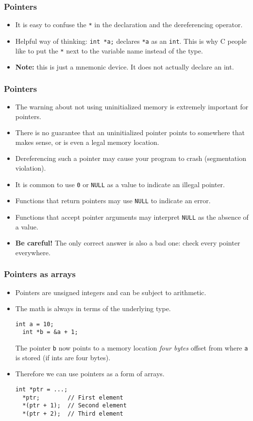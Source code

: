 \begin{frame}
  \frametitle{Pointers}
  \begin{itemize}
  \item It is easy to confuse the \texttt{*} in the declaration and the
    dereferencing operator.
  \item Helpful way of thinking: \texttt{int *a;} declares \texttt{*a} as an
    \texttt{int}. This is why C people like to put the \texttt{*} next to the
    variable name instead of the type.
  \item \textbf{Note:} this is just a mnemonic device. It does not actually
    declare an int.
  \end{itemize}
\end{frame}

\begin{frame}
  \frametitle{Pointers}
  \begin{itemize}
  \item The warning about not using uninitialized memory is extremely important
    for pointers.
  \item There is no guarantee that an uninitialized pointer points to
    somewhere that makes sense, or is even a legal memory location.
  \item Dereferencing such a pointer may cause your program to crash
    (segmentation violation).
  \item It is common to use \texttt{0} or \texttt{NULL} as a value to indicate
    an illegal pointer.
  \item Functions that return pointers may use \texttt{NULL} to indicate an
    error.
  \item Functions that accept pointer arguments may interpret \texttt{NULL} as
    the absence of a value.
  \item \textbf{Be careful!} The only correct answer is also a bad one: check
    every pointer everywhere.
  \end{itemize}
\end{frame}

\begin{frame}[fragile]
  \frametitle{Pointers as arrays}
  \begin{itemize}
  \item Pointers are unsigned integers and can be subject to arithmetic.
  \item The math is always in terms of the underlying type.
    \begin{lstlisting}[style=c]
  int a = 10;
  int *b = &a + 1;
    \end{lstlisting}
    The pointer \texttt{b} now points to a memory location \emph{four bytes}
    offset from where \texttt{a} is stored (if ints are four bytes).
  \item Therefore we can use pointers as a form of arrays.
    \begin{lstlisting}[style=c]
  int *ptr = ...;
  *ptr;        // First element
  *(ptr + 1);  // Second element
  *(ptr + 2);  // Third element
    \end{lstlisting}
  \end{itemize}
\end{frame}

